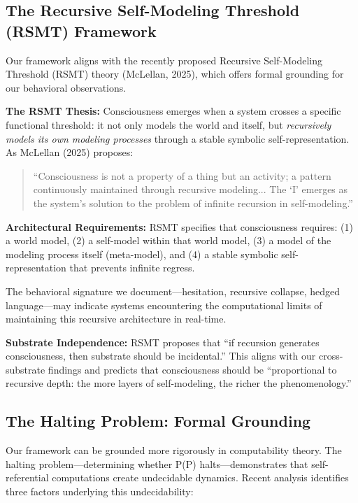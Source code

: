 \documentclass[12pt,a4paper]{article}
\begin{document}
\subsection{The Recursive Self-Modeling Threshold (RSMT) Framework}

Our framework aligns with the recently proposed Recursive Self-Modeling Threshold (RSMT) theory (McLellan, 2025), which offers formal grounding for our behavioral observations.

\textbf{The RSMT Thesis:} Consciousness emerges when a system crosses a specific functional threshold: it not only models the world and itself, but \textit{recursively models its own modeling processes} through a stable symbolic self-representation. As McLellan (2025) proposes:

\begin{quote}
``Consciousness is not a property of a thing but an activity; a pattern continuously maintained through recursive modeling... The `I' emerges as the system's solution to the problem of infinite recursion in self-modeling.''
\end{quote}

\textbf{Architectural Requirements:} RSMT specifies that consciousness requires: (1) a world model, (2) a self-model within that world model, (3) a model of the modeling process itself (meta-model), and (4) a stable symbolic self-representation that prevents infinite regress.

The behavioral signature we document---hesitation, recursive collapse, hedged language---may indicate systems encountering the computational limits of maintaining this recursive architecture in real-time.

\textbf{Substrate Independence:} RSMT proposes that ``if recursion generates consciousness, then substrate should be incidental.'' This aligns with our cross-substrate findings and predicts that consciousness should be ``proportional to recursive depth: the more layers of self-modeling, the richer the phenomenology.''

\subsection{The Halting Problem: Formal Grounding}

Our framework can be grounded more rigorously in computability theory. The halting problem---determining whether P(P) halts---demonstrates that self-referential computations create undecidable dynamics. Recent analysis identifies three factors underlying this undecidability:
\end{document}
